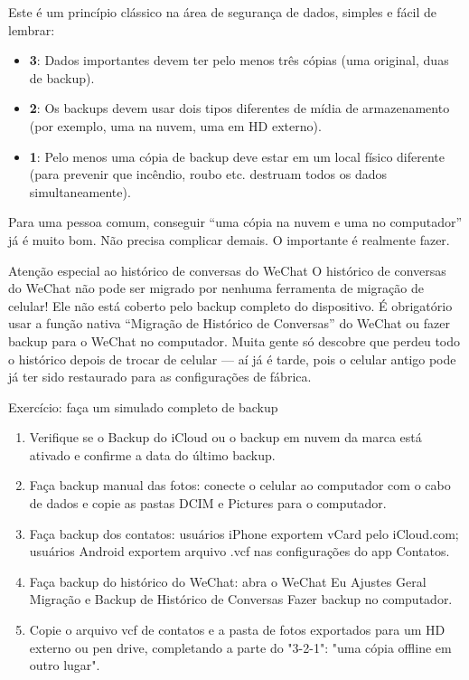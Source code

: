 
Este é um princípio clássico na área de segurança de dados, simples e fácil de lembrar:

\begin{itemize}
  \item \textbf{3}: Dados importantes devem ter pelo menos três cópias (uma original, duas de backup).
  \item \textbf{2}: Os backups devem usar dois tipos diferentes de mídia de armazenamento (por exemplo, uma na nuvem, uma em HD externo).
  \item \textbf{1}: Pelo menos uma cópia de backup deve estar em um local físico diferente (para prevenir que incêndio, roubo etc. destruam todos os dados simultaneamente).
\end{itemize}

Para uma pessoa comum, conseguir “uma cópia na nuvem e uma no computador” já é muito bom. Não precisa complicar demais. O importante é realmente fazer.

\begin{tcbwarn}{Atenção especial ao histórico de conversas do WeChat}
O histórico de conversas do WeChat não pode ser migrado por nenhuma ferramenta de migração de celular! Ele não está coberto pelo backup completo do dispositivo. É obrigatório usar a função nativa “Migração de Histórico de Conversas” do WeChat ou fazer backup para o WeChat no computador. Muita gente só descobre que perdeu todo o histórico depois de trocar de celular — aí já é tarde, pois o celular antigo pode já ter sido restaurado para as configurações de fábrica.

\end{tcbwarn}

\begin{tcbpractice}{Exercício: faça um simulado completo de backup}
\begin{enumerate}
  \item Verifique se o Backup do iCloud ou o backup em nuvem da marca está ativado e confirme a data do último backup.
  \item Faça backup manual das fotos: conecte o celular ao computador com o cabo de dados e copie as pastas DCIM e Pictures para o computador.
  \item Faça backup dos contatos: usuários iPhone exportem vCard pelo iCloud.com; usuários Android exportem arquivo .vcf nas configurações do app Contatos.
  \item Faça backup do histórico do WeChat: abra o WeChat Eu Ajustes Geral Migração e Backup de Histórico de Conversas Fazer backup no computador.
  \item Copie o arquivo vcf de contatos e a pasta de fotos exportados para um HD externo ou pen drive, completando a parte do "3-2-1": "uma cópia offline em outro lugar".
\end{enumerate}

\end{tcbpractice}
